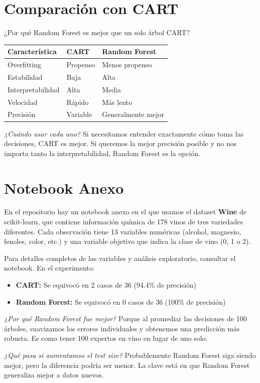 \documentclass[12pt]{article}
\begin{document}
\section{Comparación con CART}
¿Por qué Random Forest es mejor que un solo árbol CART?

\begin{table}[H]
    \centering
    \begin{tabular}{p{4cm}|p{4cm}|p{4cm}}
        \toprule
        \textbf{Característica} & \textbf{CART} & \textbf{Random Forest} \\
        \midrule
        Overfitting & Propenso & Menos propenso \\
        Estabilidad & Baja & Alta \\
        Interpretabilidad & Alta & Media \\
        Velocidad & Rápido & Más lento \\
        Precisión & Variable & Generalmente mejor \\
        \bottomrule
    \end{tabular}
\end{table}

\textit{¿Cuándo usar cada uno?} Si necesitamos entender exactamente cómo toma las decisiones, CART es mejor. Si queremos la mejor precisión posible y no nos importa tanto la interpretabilidad, Random Forest es la opción.

\section{Notebook Anexo}
En el repositorio hay un notebook anexo en el que usamos el dataset \textbf{Wine} de scikit-learn, que contiene información química de 178 vinos de tres variedades diferentes. Cada observación tiene 13 variables numéricas (alcohol, magnesio, fenoles, color, etc.) y una variable objetivo que indica la clase de vino (0, 1 o 2).

\vspace{0.5em}
Para detalles completos de las variables y análisis exploratorio, consultar el notebook. En el experimento:

\begin{itemize}
    \item \textbf{CART:} Se equivocó en 2 casos de 36 (94.4\% de precisión)
    \item \textbf{Random Forest:} Se equivocó en 0 casos de 36 (100\% de precisión)
\end{itemize}

\textit{¿Por qué Random Forest fue mejor?} Porque al promediar las decisiones de 100 árboles, suavizamos los errores individuales y obtenemos una predicción más robusta. Es como tener 100 expertos en vino en lugar de uno solo.

\vspace{1em}

\textit{¿Qué pasa si aumentamos el test size?} Probablemente Random Forest siga siendo mejor, pero la diferencia podría ser menor. La clave está en que Random Forest generaliza mejor a datos nuevos.
\end{document}
